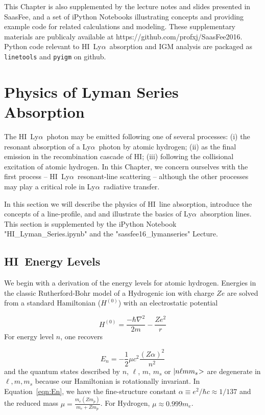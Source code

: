 \documentclass[graybox]{svmult}
\newcommand{\HI}{H{\sc I}}
\def\lya{Ly$\alpha$}
\def\ohf{\frac{1}{2}}
\def\ket#1{{|#1\negmedspace>}}
\begin{document}
This Chapter is also supplemented by the lecture notes
and slides presented in SaasFee, and a set of iPython
Notebooks illustrating concepts and providing 
example code for related calculations and modeling.
These supplementary materials are publicaly available
at https://github.com/profxj/SaasFee2016.
Python code relevant to \HI\ \lya\ absorption and 
IGM analysis are packaged as  {\tt linetools}
and {\tt pyigm} on github.

\section{Physics of Lyman Series Absorption}
\label{sec:physics}

The \HI\ \lya\ photon may be emitted following one
of several processes:
 (i) the resonant absorption of a \lya\ photon by atomic hydrogen;
 (ii) as the final emission in the recombination cascade of \HI;
 (iii) following the collisional excitation of atomic hydrogen.
In this Chapter, we concern ourselves with the first process --
\HI\ \lya\ resonant-line scattering -- although the other
processes may play a critical role in \lya\ radiative transfer.

In this section we will
  describe the physics of \HI\ line absorption,
  introduce the concepts of a line-profile, and
  and illustrate the basics of \lya\ absorption lines.
This section is supplemented by the iPython Notebook
"HI\_Lyman\_Series.ipynb" and the "sassfee16\_lymanseries"
Lecture.

\subsection{\HI\ Energy Levels}

We begin with a derivation of the energy levels 
for atomic hydrogen.  Energies in the classic
Rutherford-Bohr model of a Hydrogenic ion with charge
$Ze$ are solved from a standard Hamiltonian ($H^{(0)}$)
with an electrostatic potential

\begin{equation}
H^{(0)} = \frac{-\hbar \nabla^2}{2m} - \frac{Z e^2}{r}
\end{equation}
For energy level $n$, one recovers

\begin{equation}
E_n = -\ohf \mu c^2 \frac{(Z \alpha)^2}{n^2}
\label{eqn:En}
\end{equation}
and the quantum states described by $n$, $\ell$, $m$, $m_s$
or $\ket{n \ell m m_s}$ 
are degenerate in $\ell, m, m_s$
because our Hamiltonian is rotationally invariant.
In Equation~\ref{eqn:En}, we have
the fine-structure constant 
$\alpha \equiv e^2/\hbar c \approx 1/137$ and
the reduced mass $\mu = \frac{m_e (Z m_p)}{m_e + Z m_p}$.
For Hydrogen, $\mu \approx 0.999 m_e$. 
\end{document}
